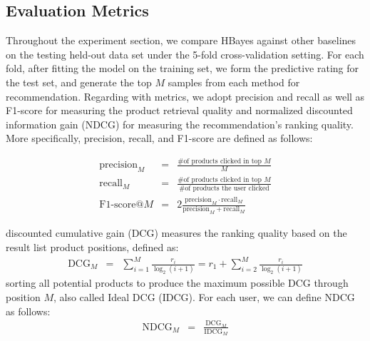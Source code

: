 \subsection{Evaluation Metrics}
Throughout the experiment section, we compare HBayes against other baselines on the testing held-out data set under the 5-fold cross-validation setting.  For each fold, after fitting the model on the training set, we form the predictive rating for the test set, and generate the top $M$ samples from each method for recommendation.  Regarding with metrics, we adopt precision and recall as well as F1-score for measuring the product retrieval quality and normalized discounted information gain (NDCG) for measuring the recommendation's ranking quality.  More specifically, precision, recall, and F1-score are defined as follows:

\begin{eqnarray}
\text{precision}_M & = & \frac{\text{\# of products clicked in top }M}{M} \nonumber \\
\text{recall}_M & = & \frac{\text{\# of products clicked in top }M}{\text{\# of products the user clicked}} \nonumber\\
\text{F1-score@} M & = & 2\frac{\text{precision}_M\cdot \text{recall}_M}{\text{precision}_M + \text{recall}_M} \nonumber
\end{eqnarray}

discounted cumulative gain (DCG) measures the ranking quality based on the result list product positions, defined as:
\begin{eqnarray}
\text{DCG}_M & = & \sum_{i=1}^M\frac{r_i}{\log_2(i+1)} =  r_1 + \sum_{i=2}^M\frac{r_i}{\log_2(i+1)}\nonumber
\end{eqnarray}
sorting all potential products to produce the maximum possible DCG through position $M$, also called Ideal DCG (IDCG).  For each user, we can define NDCG as follows:
\begin{eqnarray}
\text{NDCG}_M & = & \frac{\text{DCG}_M}{\text{IDCG}_M}\nonumber
\end{eqnarray}

